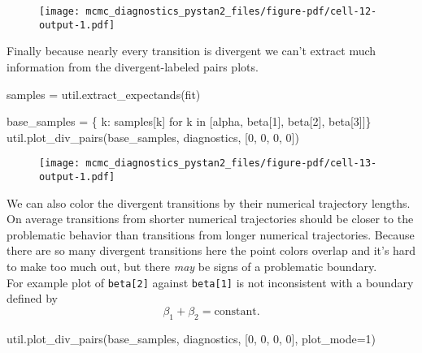 \documentclass[
  letterpaper,
  DIV=11,
  numbers=noendperiod]{scrartcl}
\newenvironment{Shaded}{\begin{snugshade}}{\end{snugshade}}
\newcommand{\ControlFlowTok}[1]{\textcolor[rgb]{0.00,0.23,0.31}{#1}}
\newcommand{\DecValTok}[1]{\textcolor[rgb]{0.68,0.00,0.00}{#1}}
\newcommand{\KeywordTok}[1]{\textcolor[rgb]{0.00,0.23,0.31}{#1}}
\newcommand{\NormalTok}[1]{\textcolor[rgb]{0.00,0.23,0.31}{#1}}
\newcommand{\OperatorTok}[1]{\textcolor[rgb]{0.37,0.37,0.37}{#1}}
\newcommand{\StringTok}[1]{\textcolor[rgb]{0.13,0.47,0.30}{#1}}
\begin{document}
\begin{figure}[H]

{\centering \texttt{[image: mcmc\_diagnostics\_pystan2\_files/figure-pdf/cell-12-output-1.pdf]}

}

\end{figure}

Finally because nearly every transition is divergent we can't extract
much information from the divergent-labeled pairs plots.

\begin{Shaded}
\begin{Highlighting}[]
\NormalTok{samples }\OperatorTok{=}\NormalTok{ util.extract\_expectands(fit)}

\NormalTok{base\_samples }\OperatorTok{=}\NormalTok{ \{ k: samples[k] }\ControlFlowTok{for}\NormalTok{ k }\KeywordTok{in} 
\NormalTok{                 [}\StringTok{\textquotesingle{}alpha\textquotesingle{}}\NormalTok{, }\StringTok{\textquotesingle{}beta[1]\textquotesingle{}}\NormalTok{, }\StringTok{\textquotesingle{}beta[2]\textquotesingle{}}\NormalTok{, }\StringTok{\textquotesingle{}beta[3]\textquotesingle{}}\NormalTok{]\}}
\NormalTok{util.plot\_div\_pairs(base\_samples, diagnostics, [}\DecValTok{0}\NormalTok{, }\DecValTok{0}\NormalTok{, }\DecValTok{0}\NormalTok{, }\DecValTok{0}\NormalTok{])}
\end{Highlighting}
\end{Shaded}

\begin{figure}[H]

{\centering \texttt{[image: mcmc\_diagnostics\_pystan2\_files/figure-pdf/cell-13-output-1.pdf]}

}

\end{figure}

We can also color the divergent transitions by their numerical
trajectory lengths. On average transitions from shorter numerical
trajectories should be closer to the problematic behavior than
transitions from longer numerical trajectories. Because there are so
many divergent transitions here the point colors overlap and it's hard
to make too much out, but there \emph{may} be signs of a problematic
boundary.\\
For example plot of \texttt{beta{[}2{]}} against \texttt{beta{[}1{]}} is
not inconsistent with a boundary defined by \[
\beta_{1} + \beta_{2} = \mathrm{constant}.
\]

\begin{Shaded}
\begin{Highlighting}[]
\NormalTok{util.plot\_div\_pairs(base\_samples, diagnostics, }
\NormalTok{                    [}\DecValTok{0}\NormalTok{, }\DecValTok{0}\NormalTok{, }\DecValTok{0}\NormalTok{, }\DecValTok{0}\NormalTok{], plot\_mode}\OperatorTok{=}\DecValTok{1}\NormalTok{)}
\end{Highlighting}
\end{Shaded}
\end{document}
